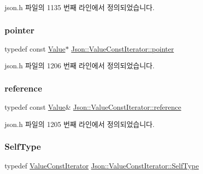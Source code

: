 json.\+h 파일의 1135 번째 라인에서 정의되었습니다.

\mbox{\label{class_json_1_1_value_const_iterator_a400136bd8bc09e9fddec0785fa2cff14}} 
\subsubsection{\texorpdfstring{pointer}{pointer}}
{\footnotesize\ttfamily typedef const \hyperlink{class_json_1_1_value}{Value}$\ast$ \hyperlink{class_json_1_1_value_const_iterator_a400136bd8bc09e9fddec0785fa2cff14}{Json\+::\+Value\+Const\+Iterator\+::pointer}}



json.\+h 파일의 1206 번째 라인에서 정의되었습니다.

\mbox{\label{class_json_1_1_value_const_iterator_aa9b05c6a37cd352ea1ee6e13b816f709}} 
\subsubsection{\texorpdfstring{reference}{reference}}
{\footnotesize\ttfamily typedef const \hyperlink{class_json_1_1_value}{Value}\& \hyperlink{class_json_1_1_value_const_iterator_aa9b05c6a37cd352ea1ee6e13b816f709}{Json\+::\+Value\+Const\+Iterator\+::reference}}



json.\+h 파일의 1205 번째 라인에서 정의되었습니다.

\mbox{\label{class_json_1_1_value_const_iterator_a0c2e33e7eb5a80dd8709fb28ece83933}} 
\subsubsection{\texorpdfstring{Self\+Type}{SelfType}}
{\footnotesize\ttfamily typedef \hyperlink{class_json_1_1_value_const_iterator}{Value\+Const\+Iterator} \hyperlink{class_json_1_1_value_const_iterator_a0c2e33e7eb5a80dd8709fb28ece83933}{Json\+::\+Value\+Const\+Iterator\+::\+Self\+Type}}




